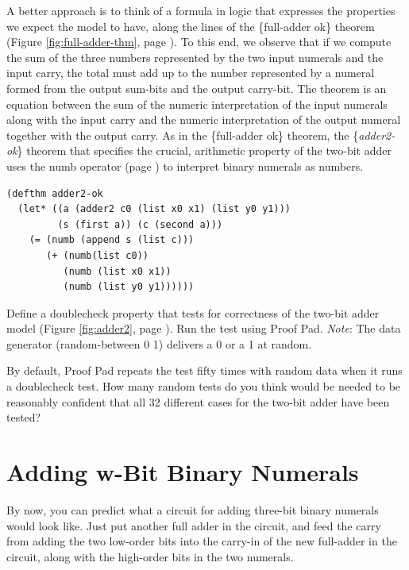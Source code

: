 A better approach is to think of a formula in logic that expresses
the properties we expect the model to have,
along the lines of the \{full-adder ok\} theorem
(Figure \ref{fig:full-adder-thm}, page \pageref{fig:full-adder-thm}).
To this end, we observe
that if we compute the sum of the three numbers represented by the two input
numerals and the input carry,
the total must add up to the number represented
by a numeral formed from the output sum-bits and
the output carry-bit.
The theorem is an equation between the
sum of the numeric interpretation of the input numerals
along with the input carry
and the numeric interpretation of the output numeral
together with the output carry.
As in the \{full-adder ok\} theorem,
the \{\emph{adder2-ok}\} theorem that specifies
the crucial, arithmetic property of the two-bit adder
uses the numb operator (page \pageref{nmb-defun})
to interpret binary numerals as numbers.

\begin{Verbatim}
(defthm adder2-ok
  (let* ((a (adder2 c0 (list x0 x1) (list y0 y1)))
         (s (first a)) (c (second a)))
    (= (numb (append s (list c)))
       (+ (numb(list c0))
          (numb (list x0 x1))
          (numb (list y0 y1))))))
\end{Verbatim}
\label{adder2-ok}

\begin{ExerciseList}
\Exercise Define a doublecheck property that tests
for correctness of the two-bit adder model
(Figure \ref{fig:adder2}, page \pageref{fig:adder2}).
Run the test using Proof Pad.
\emph{Note}: The data generator (random-between 0 1) delivers
a 0 or a 1 at random.

\Exercise By default, Proof Pad repeats the test fifty times
with random data
when it runs a doublecheck test.
How many random tests do you think would be needed to be reasonably
confident that all 32 different cases for the two-bit adder have been tested?
\end{ExerciseList}

\section{Adding w-Bit Binary Numerals}
\label{sec:adding-w-bit-numerals}

By now, you can predict what a circuit for adding three-bit
binary numerals would look like.
Just put another full adder in the circuit, and feed the
carry from adding the two low-order bits into the carry-in
of the new full-adder in the circuit, along with
the high-order bits in the two numerals.

